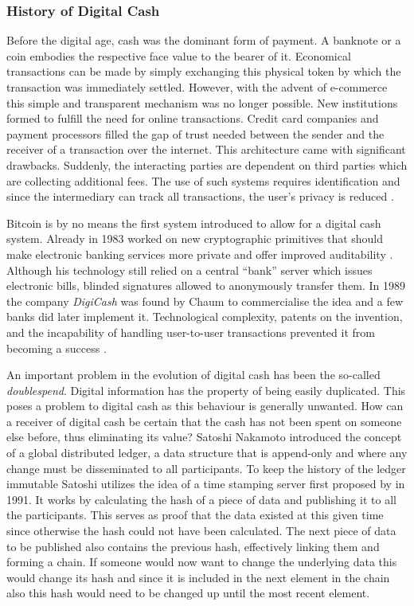 \documentclass[final]{fhnwreport}       %
\begin{document}
\subsubsection{History of Digital Cash}
Before the digital age, cash was the dominant form of payment. A banknote or a coin embodies the respective face value to the bearer of it. Economical transactions can be made by simply exchanging this physical token by which the transaction was immediately settled. However, with the advent of e-commerce this simple and transparent mechanism was no longer possible. New institutions formed to fulfill the need for online transactions. Credit card companies and payment processors filled the gap of trust needed between the sender and the receiver of a transaction over the internet. This architecture came with significant drawbacks. Suddenly, the interacting parties are dependent on third parties which are collecting additional fees. The use of such systems requires identification and since the intermediary can track all transactions, the user's privacy is reduced \citep{narayanan_bitcoin_2016}.

Bitcoin is by no means the first system introduced to allow for a digital cash system. Already in 1983 \citeauthor{chaum_blind_1983} worked on new cryptographic primitives that should make electronic banking services more private and offer improved auditability \citep{chaum_blind_1983}. Although his technology still relied on a central ``bank'' server which issues electronic bills, blinded signatures allowed to anonymously transfer them. In 1989 the company \emph{DigiCash} was found by Chaum to commercialise the idea and a few banks did later implement it. Technological complexity, patents on the invention, and the incapability of handling user-to-user transactions prevented it from becoming a success \citep{narayanan_bitcoin_2016}. 

An important problem in the evolution of digital cash has been the so-called \emph{\gls{doublespend}}. Digital information has the property of being easily duplicated. This poses a problem to digital cash as this behaviour is generally unwanted. How can a receiver of digital cash be certain that the cash has not been spent on someone else before, thus eliminating its value? Satoshi Nakamoto introduced the concept of a global distributed ledger, a data structure that is append-only and where any change must be disseminated to all participants. To keep the history of the ledger immutable Satoshi utilizes the idea of a time stamping server first proposed by \textcite{haber_how_1991} in 1991. It works by calculating the \gls{hash} of a piece of data and publishing it to all the participants. This serves as proof that the data existed at this given time since otherwise the \gls{hash} could not have been calculated. The next piece of data to be published also contains the previous \gls{hash}, effectively linking them and forming a chain. If someone would now want to change the underlying data this would change its \gls{hash} and since it is included in the next element in the chain also this \gls{hash} would need to be changed up until the most recent element. 
\end{document}
